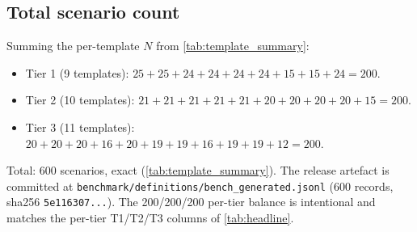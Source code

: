 \subsection{Total scenario count}

Summing the per-template $N$ from \cref{tab:template_summary}:
\begin{itemize}
\item Tier 1 (9 templates): $25{+}25{+}24{+}24{+}24{+}24{+}15{+}15{+}24 = 200$.
\item Tier 2 (10 templates): $21{+}21{+}21{+}21{+}21{+}20{+}20{+}20{+}20{+}15 = 200$.
\item Tier 3 (11 templates): $20{+}20{+}20{+}16{+}20{+}19{+}19{+}16{+}19{+}19{+}12 = 200$.
\end{itemize}
Total: 600 scenarios, exact (\cref{tab:template_summary}). The release artefact is committed at \texttt{benchmark/definitions/bench\_generated.jsonl} (600 records, sha256 \texttt{5e116307...}).
The 200/200/200 per-tier balance is intentional and matches the per-tier T1/T2/T3 columns of \cref{tab:headline}.
